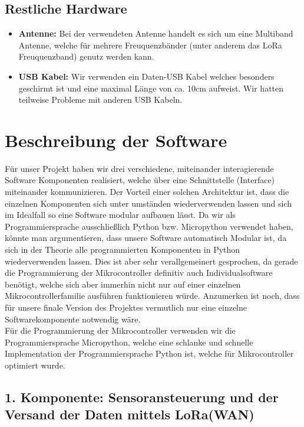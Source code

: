\newpage

\subsection{Restliche Hardware} \label{Restliche Hardware}


\begin{itemize} 
	\item \textbf{Antenne:}  Bei der verwendeten Antenne handelt es sich um eine Multiband Antenne, welche für mehrere Freuquenzbänder (unter anderem das LoRa Freuquenzband) genutz werden kann.
	\item \textbf{USB Kabel:} Wir verwenden ein Daten-USB Kabel welches besonders geschirmt ist und eine maximal Länge von ca. 10cm aufweist. Wir hatten teilweise Probleme mit anderen USB Kabeln.
\end{itemize}



\section{Beschreibung der Software} \label{Software}

Für unser Projekt haben wir drei verschiedene, miteinander interagierende Software Komponenten realisiert, welche über eine Schnittstelle (Interface) miteinander kommunizieren. 
Der Vorteil einer solchen Architektur ist, dass die einzelnen Komponenten sich unter umständen wiederverwenden lassen und sich im Idealfall so eine Software modular aufbauen lässt.
Da wir als Programmiersprache ausschließlich Python bzw. Micropython verwendet haben, könnte man argumentieren, dass unsere Software automatisch Modular ist, da sich in der Theorie alle programmierten Komponenten in Python wiederverwenden lassen.
Dies ist aber sehr verallgemeinert gesprochen, da gerade die Programmierung der Mikrocontroller definitiv auch Individualsoftware benötigt, welche sich aber immerhin nicht nur auf einer einzelnen Mikrocontrollerfamilie ausführen funktionieren würde.
Anzumerken ist noch, dass für unsere finale Version des Projektes vermutlich nur eine einzelne Softwarekomponente notwendig wäre.\\
Für die Programmierung der Mikrocontroller verwenden wir die Programmiersprache Micropython, welche eine schlanke und schnelle Implementation der Programmiersprache Python ist, welche für Mikrocontroller optimiert wurde.

\newpage


\subsection{1. Komponente: Sensoransteuerung und der Versand der Daten mittels LoRa(WAN)} \label{Sender}



